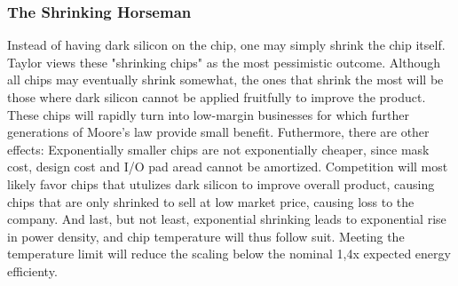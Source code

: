 \subsubsection{The Shrinking Horseman}
Instead of having dark silicon on the chip, one may simply shrink the chip itself.
Taylor\cite{dark-silicon} views these "shrinking chips" as the most pessimistic outcome.
Although all chips may eventually shrink somewhat, the ones that shrink the most will be those where dark silicon cannot be applied fruitfully to improve the product.
These chips will rapidly turn into low-margin businesses for which further generations of Moore’s law provide small benefit.
Futhermore, there are other effects: Exponentially smaller chips are not exponentially cheaper, since mask cost, design cost and I/O pad aread cannot be amortized. 
Competition will most likely favor chips that utulizes dark silicon to improve overall product, causing chips that are only shrinked to sell at low market price, causing loss to the company.
And last, but not least, exponential shrinking leads to exponential rise in power density, and chip temperature will thus follow suit.
Meeting the temperature limit will reduce the scaling below the nominal 1,4x expected energy efficienty. 




